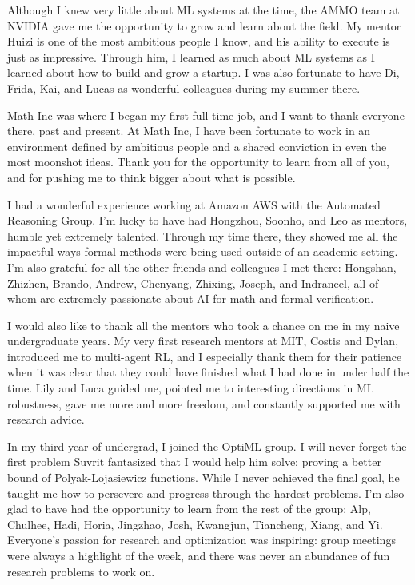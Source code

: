 Although I knew very little about ML systems at the time, the AMMO team at NVIDIA gave me the opportunity to grow and learn about the field. My mentor Huizi is one of the most ambitious people I know, and his ability to execute is just as impressive. Through him, I learned as much about ML systems as I learned about how to build and grow a startup. I was also fortunate to have Di, Frida, Kai, and Lucas as wonderful colleagues during my summer there.

Math Inc was where I began my first full-time job, and I want to thank everyone there, past and present. At Math Inc, I have been fortunate to work in an environment defined by ambitious people and a shared conviction in even the most moonshot ideas. Thank you for the opportunity to learn from all of you, and for pushing me to think bigger about what is possible.

I had a wonderful experience working at Amazon AWS with the Automated Reasoning Group. I'm lucky to have had Hongzhou, Soonho, and Leo as mentors, humble yet extremely talented. Through my time there, they showed me all the impactful ways formal methods were being used outside of an academic setting. I'm also grateful for all the other friends and colleagues I met there: Hongshan, Zhizhen, Brando, Andrew, Chenyang, Zhixing, Joseph, and Indraneel, all of whom are extremely passionate about AI for math and formal verification.

I would also like to thank all the mentors who took a chance on me in my naive undergraduate years. My very first research mentors at MIT, Costis and Dylan, introduced me to multi-agent RL, and I especially thank them for their patience when it was clear that they could have finished what I had done in under half the time. Lily and Luca guided me, pointed me to interesting directions in ML robustness, gave me more and more freedom, and constantly supported me with research advice.

In my third year of undergrad, I joined the OptiML group. I will never forget the first problem Suvrit fantasized that I would help him solve: proving a better bound of Polyak-Lojasiewicz functions. While I never achieved the final goal, he taught me how to persevere and progress through the hardest problems. I'm also glad to have had the opportunity to learn from the rest of the group: Alp, Chulhee, Hadi, Horia, Jingzhao, Josh, Kwangjun, Tiancheng, Xiang, and Yi. Everyone's passion for research and optimization was inspiring: group meetings were always a highlight of the week, and there was never an abundance of fun research problems to work on.

